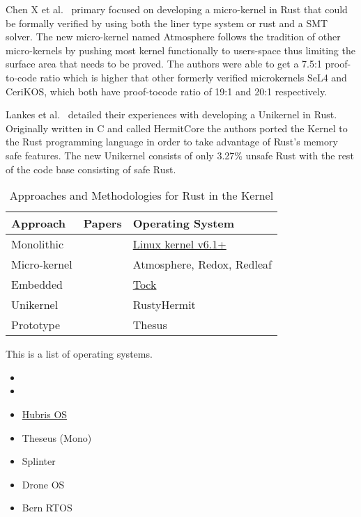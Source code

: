 \documentclass[sigconf]{acmart}
\begin{document}
Chen X et al.~\cite{Chen2023-wb} primary focused on developing a micro-kernel in Rust that could be
formally verified by using both the liner type system or rust and a SMT solver. The new micro-kernel
named Atmosphere follows the tradition of other micro-kernels by pushing most kernel functionally to
users-space thus limiting the surface area that needs to be proved. The authors were able to get a
7.5:1 proof-to-code ratio which is higher that other formerly verified microkernels SeL4 and
CeriKOS, which both have proof-tocode ratio of 19:1 and 20:1 respectively.

Lankes et al.~\cite{Lankes2019-cm} detailed their experiences with developing a Unikernel in
Rust. Originally written in C and called HermitCore the authors ported the Kernel to the Rust
programming language in order to take advantage of Rust's memory safe features. The new Unikernel
consists of only 3.27\% unsafe Rust with the rest of the code base consisting of safe Rust.

\begin{table*}
    \begin{tabular}{||p{2cm}|p{2cm}|p{8cm}||}
    \hline
    Approach & Papers & Operating System\\
    \hline\hline
    Monolithic  & ~\cite{The_kernel_development_community_undated-iw} & \href{https://docs.kernel.org/rust/}{Linux kernel v6.1+}\\
    Micro-kernel & ~\cite{Chen2023-wb} & Atmosphere, Redox, Redleaf\\
    Embedded & ~\cite{Culic2022-bk} & \href{https://github.com/tock/tock}{Tock} \\
    Unikernel & ~\cite{Lankes2019-cm} & RustyHermit \\
    Prototype & ~\cite{Boos2020-zh, Ijaz2023-da} & Thesus \\
    \hline
  \end{tabular}
  \caption{Approaches and Methodologies for Rust in the Kernel}
    \label{tab:RQ1}
\end{table*}

This is a list of operating systems.
\begin{itemize}
\item 
\item 
\item \href{https://hubris.oxide.computer/}{Hubris OS}
\item Theseus (Mono)

\item Splinter

\item Drone OS
\item Bern RTOS


\end{itemize}
\end{document}
